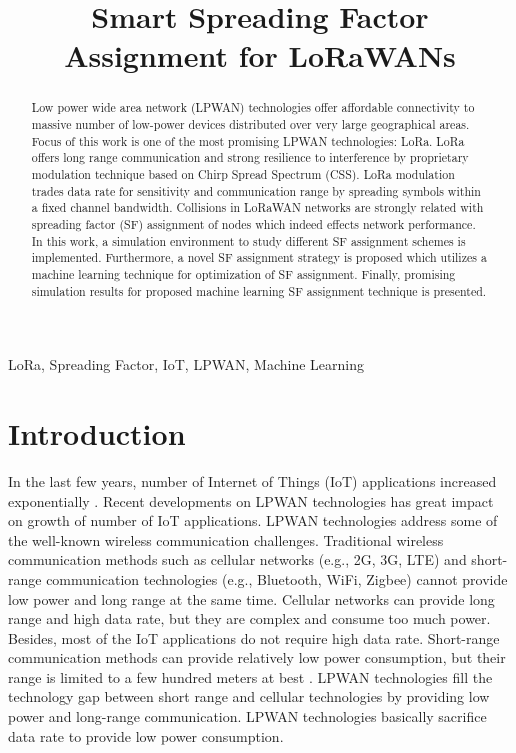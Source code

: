 \documentclass[conference]{IEEEtran}
\begin{document}
\title{Smart Spreading Factor Assignment for LoRaWANs}


\author{
}
\maketitle


\begin{abstract}
Low power wide area network (LPWAN) technologies offer affordable connectivity to massive number of low-power devices distributed over very large geographical areas. Focus of this work is one of the most promising LPWAN technologies: LoRa. LoRa offers long range communication and strong resilience to interference by proprietary modulation technique based on Chirp Spread Spectrum (CSS). LoRa modulation trades data rate for sensitivity and communication range by spreading symbols within a fixed channel bandwidth. Collisions in LoRaWAN networks are strongly related with spreading factor (SF) assignment of nodes which indeed effects network performance. In this work, a simulation environment to study different SF assignment schemes is implemented. Furthermore, a novel SF assignment strategy is proposed which utilizes a machine learning technique for optimization of SF assignment. Finally, promising simulation results for proposed machine learning SF assignment technique is presented.
\end{abstract}


\begin{IEEEkeywords}
LoRa, Spreading Factor, IoT, LPWAN, Machine Learning
\end{IEEEkeywords}


\section{Introduction}
\par In the last few years, number of Internet of Things (IoT) applications increased exponentially \cite{7721743}. Recent developments on LPWAN technologies has great impact on growth of number of IoT applications. LPWAN technologies address some of the well-known wireless communication challenges. Traditional wireless communication methods such as cellular networks (e.g., 2G, 3G, LTE) and short-range communication technologies (e.g., Bluetooth, WiFi, Zigbee) cannot provide low power and long range at the same time. Cellular networks can provide long range and high data rate, but they are complex and consume too much power. Besides, most of the IoT applications do not require high data rate. Short-range communication methods can provide relatively low power consumption, but their range is limited to a few hundred meters at best \cite{7815384}. LPWAN technologies fill the technology gap between short range and cellular technologies by providing low power and long-range communication. LPWAN technologies basically sacrifice data rate to provide low power consumption.
\end{document}
